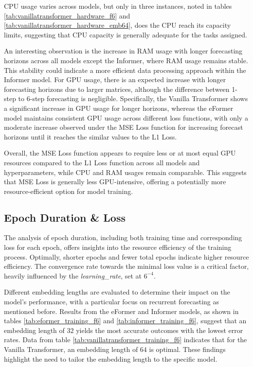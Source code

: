 \documentclass{article}
\begin{document}
CPU usage varies across models, but only in three instances, noted in tables \ref{tab:vanillatransformer_hardware_f6} and \ref{tab:vanillatransformer_hardware_emb64}, does the CPU reach its capacity limits, suggesting that CPU capacity is generally adequate for the tasks assigned.

An interesting observation is the increase in RAM usage with longer forecasting horizons across all models except the Informer, where RAM usage remains stable. This stability could indicate a more efficient data processing approach within the Informer model. For GPU usage, there is an expected increase with longer forecasting horizons due to larger matrices, although the difference between 1-step to 6-step forecasting is negligible. Specifically, the Vanilla Transformer shows a significant increase in GPU usage for longer horizons, whereas the eFormer model maintains consistent GPU usage across different loss functions, with only a moderate increase observed under the MSE Loss function for increasing forecast horizons until it reaches the similar values to the L1 Loss.

Overall, the MSE Loss function appears to require less or at most equal GPU resources compared to the L1 Loss function across all models and hyperparameters, while CPU and RAM usages remain comparable. This suggests that MSE Loss is generally less GPU-intensive, offering a potentially more resource-efficient option for model training.


\subsection{Epoch Duration \& Loss}

The analysis of epoch duration, including both training time and corresponding loss for each epoch, offers insights into the resource efficiency of the training process. Optimally, shorter epochs and fewer total epochs indicate higher resource efficiency. The convergence rate towards the minimal loss value is a critical factor, heavily influenced by the \textit{learning\_rate}, set at $6^{-4}$.

Different embedding lengths are evaluated to determine their impact on the model's performance, with a particular focus on recurrent forecasting as mentioned before. Results from the eFormer and Informer models, as shown in tables \ref{tab:eformer_training_f6} and \ref{tab:informer_training_f6}, suggest that an embedding length of $32$ yields the most accurate outcomes with the lowest error rates. Data from table \ref{tab:vanillatransformer_training_f6} indicates that for the Vanilla Transformer, an embedding length of $64$ is optimal. These findings highlight the need to tailor the embedding length to the specific model.
\end{document}
